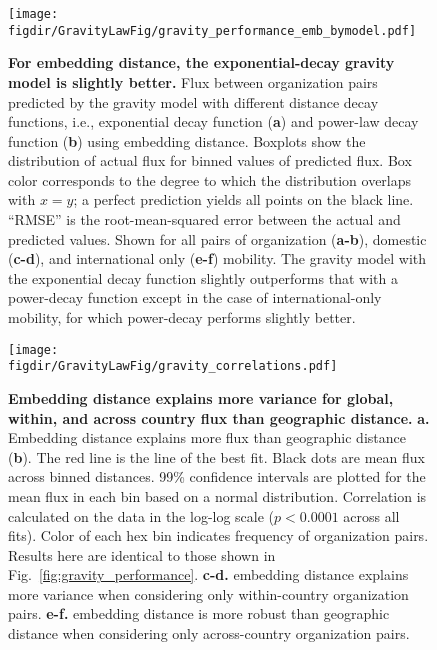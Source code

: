 \documentclass[12pt]{article} %
\def\figdir{../Figs}
\begin{document}
%
%
\begin{figure}[p!]
	\centering
	\texttt{[image: \\figdir/GravityLawFig/gravity\_performance\_emb\_bymodel.pdf]}
	\caption{
		\textbf{For embedding distance, the exponential-decay gravity model is slightly better.}
		Flux between organization pairs predicted by the gravity model with different distance decay functions, i.e., exponential decay function (\textbf{a}) and power-law decay function (\textbf{b}) using embedding distance.
		Boxplots show the distribution of actual flux for binned values of predicted flux.
		Box color corresponds to the degree to which the distribution overlaps with $x = y$; 
		a perfect prediction yields all points on the black line.
		``RMSE'' is the root-mean-squared error between the actual and predicted values.
		Shown for all pairs of organization (\textbf{a-b}), domestic (\textbf{c-d}), and international only (\textbf{e-f}) mobility.
		The gravity model with the exponential decay function slightly outperforms that with a power-decay function except in the case of international-only mobility, for which power-decay performs slightly better. 
	}
	\label{fig:supp:predict_emb_bymodel}
\end{figure}



%
%
\begin{figure}[p!]
	\centering
	\texttt{[image: \\figdir/GravityLawFig/gravity\_correlations.pdf]}
	\caption{
		\textbf{Embedding distance explains more variance for global, within, and across country flux than geographic distance.}
		\textbf{a.}
		Embedding distance explains more flux than geographic distance (\textbf{b}).
		The red line is the line of the best fit.
		Black dots are mean flux across binned distances.
		99\% confidence intervals are plotted for the mean flux in each bin based on a normal distribution. 
		Correlation is calculated on the data in the log-log scale ($p < 0.0001$ across all fits).
		Color of each hex bin indicates frequency of organization pairs.
		Results here are identical to those shown in Fig.~\ref{fig:gravity_performance}.
		\textbf{c-d.}	embedding distance explains more variance when considering only within-country organization pairs.
		\textbf{e-f.} embedding distance is more robust than geographic distance when considering only across-country organization pairs.
	}
	\label{fig:supp:gravity_correlation}
\end{figure}
\end{document}
